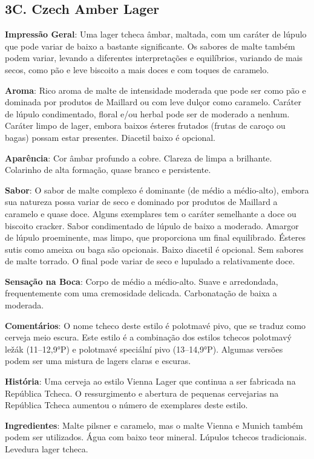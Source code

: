 \subsection*{3C. Czech Amber Lager}
\textbf{Impressão Geral}: Uma lager tcheca âmbar, maltada, com um caráter de lúpulo que pode variar de baixo a bastante significante. Os sabores de malte também podem variar, levando a diferentes interpretações e equilíbrios, variando de mais secos, como pão e leve biscoito a mais doces e com toques de caramelo.

\textbf{Aroma}: Rico aroma de malte de intensidade moderada que pode ser como pão e dominada por produtos de Maillard ou com leve dulçor como caramelo. Caráter de lúpulo condimentado, floral e/ou herbal pode ser de moderado a nenhum. Caráter limpo de lager, embora baixos ésteres frutados (frutas de caroço ou bagas) possam estar presentes. Diacetil baixo é opcional.

\textbf{Aparência}: Cor âmbar profundo a cobre. Clareza de limpa a brilhante. Colarinho de alta formação, quase branco e persistente.

\textbf{Sabor}: O sabor de malte complexo é dominante (de médio a médio-alto), embora sua natureza possa variar de seco e dominado por produtos de Maillard a caramelo e quase doce. Alguns exemplares tem o caráter semelhante a doce ou biscoito cracker. Sabor condimentado de lúpulo de baixo a moderado. Amargor de lúpulo proeminente, mas limpo, que proporciona um final equilibrado. Ésteres sutis como ameixa ou baga são opcionais. Baixo diacetil é opcional. Sem sabores de malte torrado. O final pode variar de seco e lupulado a relativamente doce.

\textbf{Sensação na Boca}: Corpo de médio a médio-alto. Suave e arredondada, frequentemente com uma cremosidade delicada. Carbonatação de baixa a moderada.

\textbf{Comentários}: O nome tcheco deste estilo é polotmavé pivo, que se traduz como cerveja meio escura. Este estilo é a combinação dos estilos tchecos polotmavý ležák (11–12,9°P) e polotmavé speciální pivo (13–14,9°P). Algumas versões podem ser uma mistura de lagers claras e escuras.

\textbf{História}: Uma cerveja ao estilo Vienna Lager que continua a ser fabricada na República Tcheca. O ressurgimento e abertura de pequenas cervejarias na República Tcheca aumentou o número de exemplares deste estilo.

\textbf{Ingredientes}: Malte pilsner e caramelo, mas o malte Vienna e Munich também podem ser utilizados. Água com baixo teor mineral. Lúpulos tchecos tradicionais. Levedura lager tcheca.


